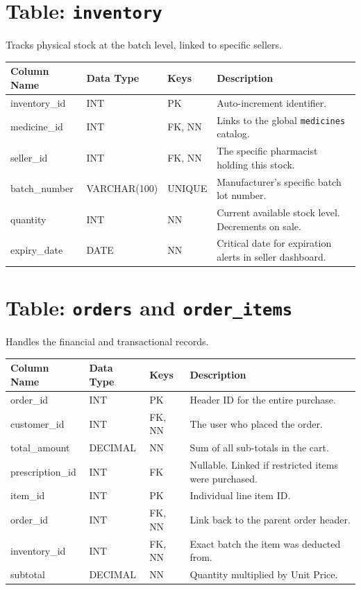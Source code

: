 \documentclass[12pt,a4paper]{report}
\begin{document}
\section{Table: \texttt{inventory}}
Tracks physical stock at the batch level, linked to specific sellers.
\begin{longtable}{>{\ttfamily}p{3cm} p{3cm} p{2cm} p{6cm}}
\toprule
\rowcolor{headerBlue}\color{white}\textbf{Column Name} & \color{white}\textbf{Data Type} & \color{white}\textbf{Keys} & \color{white}\textbf{Description} \\
\midrule
\endfirsthead
inventory\_id & INT & PK & Auto-increment identifier. \\
\rowcolor{rowOdd}medicine\_id & INT & FK, NN & Links to the global \texttt{medicines} catalog. \\
seller\_id & INT & FK, NN & The specific pharmacist holding this stock. \\
\rowcolor{rowOdd}batch\_number & VARCHAR(100)& UNIQUE & Manufacturer's specific batch lot number. \\
quantity & INT & NN & Current available stock level. Decrements on sale. \\
\rowcolor{rowOdd}expiry\_date & DATE & NN & Critical date for expiration alerts in seller dashboard. \\
\bottomrule
\end{longtable}

\section{Table: \texttt{orders} and \texttt{order\_items}}
Handles the financial and transactional records.
\begin{longtable}{>{\ttfamily}p{3.5cm} p{2cm} p{2cm} p{6.5cm}}
\toprule
\rowcolor{headerBlue}\color{white}\textbf{Column Name} & \color{white}\textbf{Data Type} & \color{white}\textbf{Keys} & \color{white}\textbf{Description} \\
\midrule
\endfirsthead
order\_id & INT & PK & Header ID for the entire purchase. \\
\rowcolor{rowOdd}customer\_id & INT & FK, NN & The user who placed the order. \\
total\_amount & DECIMAL & NN & Sum of all sub-totals in the cart. \\
\rowcolor{rowOdd}prescription\_id & INT & FK & Nullable. Linked if restricted items were purchased. \\
\midrule
item\_id & INT & PK & Individual line item ID. \\
\rowcolor{rowOdd}order\_id & INT & FK, NN & Link back to the parent order header. \\
inventory\_id & INT & FK, NN & Exact batch the item was deducted from. \\
\rowcolor{rowOdd}subtotal & DECIMAL & NN & Quantity multiplied by Unit Price. \\
\bottomrule
\end{longtable}
\end{document}
